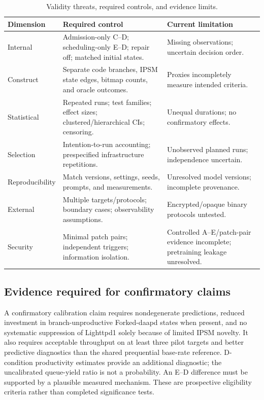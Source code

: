 \documentclass[final,5p,times,number]{elsarticle}
\begin{document}
\begin{table}[!tbp]
\centering\small
\caption{Validity threats, required controls, and evidence limits.}
\label{tab:threats}
\begin{tabularx}{\textwidth}{l Y Y}
\toprule
Dimension & Required control & Current limitation \\
\midrule
Internal & Admission-only C--D; scheduling-only E--D; repair off; matched initial states. & Missing observations; uncertain decision order. \\
Construct & Separate code branches, IPSM state edges, bitmap counts, and oracle outcomes. & Proxies incompletely measure intended criteria. \\
Statistical & Repeated runs; test families; effect sizes; clustered/hierarchical CIs; censoring. & Unequal durations; no confirmatory effects. \\
Selection & Intention-to-run accounting; prespecified infrastructure repetitions. & Unobserved planned runs; independence uncertain. \\
Reproducibility & Match versions, settings, seeds, prompts, and measurements. & Unresolved model versions; incomplete provenance. \\
External & Multiple targets/protocols; boundary cases; observability assumptions. & Encrypted/opaque binary protocols untested. \\
Security & Minimal patch pairs; independent triggers; information isolation. & Controlled A--E/patch-pair evidence incomplete; pretraining leakage unresolved. \\
\bottomrule
\end{tabularx}
\end{table}

\subsection{Evidence required for confirmatory claims}
A confirmatory calibration claim requires nondegenerate predictions, reduced investment in branch-unproductive Forked-daapd states when present, and no systematic suppression of Lighttpd1 solely because of limited IPSM novelty. It also requires acceptable throughput on at least three pilot targets and better predictive diagnostics than the shared prequential base-rate reference. D-condition productivity estimates provide an additional diagnostic; the uncalibrated queue-yield ratio is not a probability. An E--D difference must be supported by a plausible measured mechanism. These are prospective eligibility criteria rather than completed significance tests.
\end{document}
